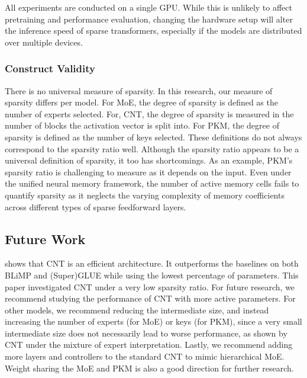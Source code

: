 All experiments are conducted on a single GPU. While this is unlikely to affect pretraining and performance evaluation, changing the hardware setup will alter the inference speed of sparse transformers, especially if the models are distributed over multiple devices.
\subsubsection{Construct Validity}
There is no universal measure of sparsity. In this research, our measure of sparsity differs per model. For MoE, the degree of sparsity is defined as the number of experts selected. For, CNT, the degree of sparsity is measured in the number of blocks the activation vector is split into. For PKM, the degree of sparsity is defined as the number of keys selected. These definitions do not always correspond to the sparsity ratio well. Although the sparsity ratio appears to be a universal definition of sparsity, it too has shortcomings. As an example, PKM's sparsity ratio is challenging to measure as it depends on the input. Even under the unified neural memory framework, the number of active memory cells fails to quantify sparsity as it neglects the varying complexity of memory coefficients across different types of sparse feedforward layers.

\subsection{Future Work}
 shows that CNT is an efficient architecture. It outperforms the baselines on both BLiMP and (Super)GLUE while using the lowest percentage of parameters. This paper investigated CNT under a very low sparsity ratio. For future research, we recommend studying the performance of CNT with more active parameters. For other models, we recommend reducing the intermediate size, and instead increasing the number of experts (for MoE) or keys (for PKM), since a very small intermediate size does not necessarily lead to worse performance, as shown by CNT under the mixture of expert interpretation. Lastly, we recommend adding more layers and controllers to the standard CNT to mimic hierarchical MoE. Weight sharing the MoE and PKM is also a good direction for further research.